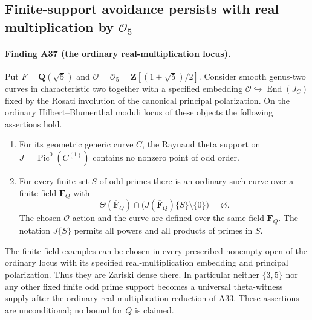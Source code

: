 \subsection{Finite-support avoidance persists with real multiplication by
\texorpdfstring{$\mathcal O_5$}{O5}}
\label{sec:rm5-avoidance}

\paragraph{Finding A37 (the ordinary real-multiplication locus).}
Put $F=\mathbf Q(\sqrt5)$ and
$\mathcal O=\mathcal O_5=\mathbf Z[(1+\sqrt5)/2]$.
Consider smooth genus-two curves in characteristic two together with
a specified embedding $\mathcal O\hookrightarrow\operatorname{End}(J_C)$
fixed by the Rosati involution of the canonical principal polarization.
On the ordinary Hilbert--Blumenthal moduli locus of these objects the
following assertions hold.

\begin{enumerate}
\item For its geometric generic curve $C$, the Raynaud theta support on
$J=\operatorname{Pic}^0(C^{(1)})$ contains no nonzero point of odd order.
\item For every finite set $S$ of odd primes there is an ordinary such
curve over a finite field $\mathbf F_Q$ with
\[
 \Theta(\overline{\mathbf F}_Q)\cap
 \bigl(J(\overline{\mathbf F}_Q)\{S\}\setminus\{0\}\bigr)
                         =\varnothing.                       \tag{RM.1}
\]
The chosen $\mathcal O$ action and the curve are defined over the same
field $\mathbf F_Q$.  The notation $J\{S\}$ permits all powers and all
products of primes in $S$.
\end{enumerate}

The finite-field examples can be chosen in every prescribed nonempty
open of the ordinary locus with its specified real-multiplication
embedding and principal polarization.  Thus they are Zariski dense
there.  In particular neither $\{3,5\}$ nor any other fixed finite odd
prime support becomes a universal theta-witness supply after the
ordinary real-multiplication reduction of A33.  These assertions are
unconditional; no bound for $Q$ is claimed.

